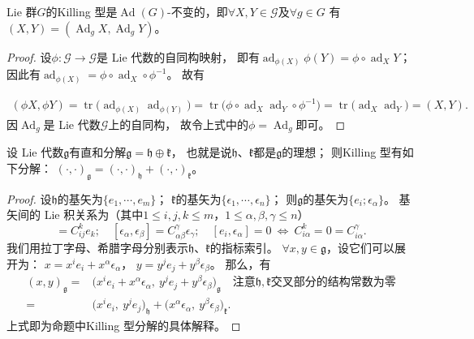 \begin{proposition}
     Lie 群$G$的Killing 型是$\operatorname{Ad}(G)$-不变的，即$\forall X,Y \in \mathscr{G}$及$\forall g\in G$
    有$(X,Y)=(\operatorname{Ad}_g X, \operatorname{Ad}_g Y )$。
\end{proposition}
\begin{proof}
    设$\phi:\mathscr{G}\to \mathscr{G}$是 Lie 代数的自同构映射，
    即有$\operatorname{ad}_{\phi(X)} \phi(Y)= \phi\circ \operatorname{ad}_X Y$；
    因此有$\operatorname{ad}_{\phi(X)} = \phi\circ \operatorname{ad}_X \circ \phi^{-1}$。    故有

    \begin{align*}
        (\phi X, \phi Y )= \operatorname{tr}\bigl( \operatorname{ad}_{\phi(X)} \operatorname{ad}_{\phi(Y)}\bigr)
        =\operatorname{tr}\bigl( \phi\circ \operatorname{ad}_X \operatorname{ad}_Y \circ \phi^{-1}\bigr)
        =\operatorname{tr}\bigl( \operatorname{ad}_X \operatorname{ad}_Y \bigr) = (X,Y).
    \end{align*}
    因$\operatorname{Ad}_g$是 Lie 代数$\mathscr{G}$上的自同构，
    故令上式中的$\phi=\operatorname{Ad}_g$即可。
\end{proof}

\begin{proposition}
    设 Lie 代数$\mathfrak{g}$有直和分解$\mathfrak{g}=\mathfrak{h}\oplus\mathfrak{k}$，
    也就是说$\mathfrak{h}$、$\mathfrak{k}$都是$\mathfrak{g}$的理想；
    则Killing 型有如下分解：
    $(\cdot,\cdot)_{\mathfrak{g}}=(\cdot,\cdot)_{\mathfrak{h}}+(\cdot,\cdot)_{\mathfrak{k}}$。
\end{proposition}
\begin{proof}
    设$\mathfrak{h}$的基矢为$\{e_1,\cdots,e_m\}$；
    $\mathfrak{k}$的基矢为$\{\epsilon_1,\cdots,\epsilon_n\}$；
    则$\mathfrak{g}$的基矢为$\{e_i;\epsilon_\alpha\}$。
    基矢间的 Lie 积关系为（其中$1\leqslant i,j,k \leqslant m$，$1\leqslant \alpha,\beta,\gamma \leqslant n$）
    \begin{equation*}
        [e_i,e_j]=C_{ij}^k e_k;\quad
        [\epsilon_\alpha,\epsilon_\beta]=C_{\alpha\beta}^\gamma \epsilon_\gamma;\quad
        [e_i,\epsilon_\alpha]=0   \  \Leftrightarrow \
        C_{i\alpha}^k=0=C_{i\alpha}^\gamma.
    \end{equation*}
    我们用拉丁字母、希腊字母分别表示$\mathfrak{h}$、$\mathfrak{k}$的指标索引。
    $\forall x,y \in \mathfrak{g}$，设它们可以展开为：
    $x= x^i e_i + x^\alpha \epsilon_\alpha$，
    $y= y^j e_j + y^\beta \epsilon_\beta$。
    那么，有
    \begin{align*}
        (x,y)_{\mathfrak{g}}=& \bigl(x^i e_i + x^\alpha \epsilon_\alpha,\
         y^j e_j + y^\beta \epsilon_\beta\bigr)_{\mathfrak{g}}\quad
         \text{注意}\mathfrak{h},\mathfrak{k}\text{交叉部分的结构常数为零}\\
         =&\bigl(x^ie_i ,\ y^je_j \bigr)_{\mathfrak{h}}
         + \bigl(x^\alpha\epsilon_\alpha,\ y^\beta\epsilon_\beta\bigr)_{\mathfrak{k}} .
    \end{align*}
    上式即为命题中Killing 型分解的具体解释。
\end{proof}

